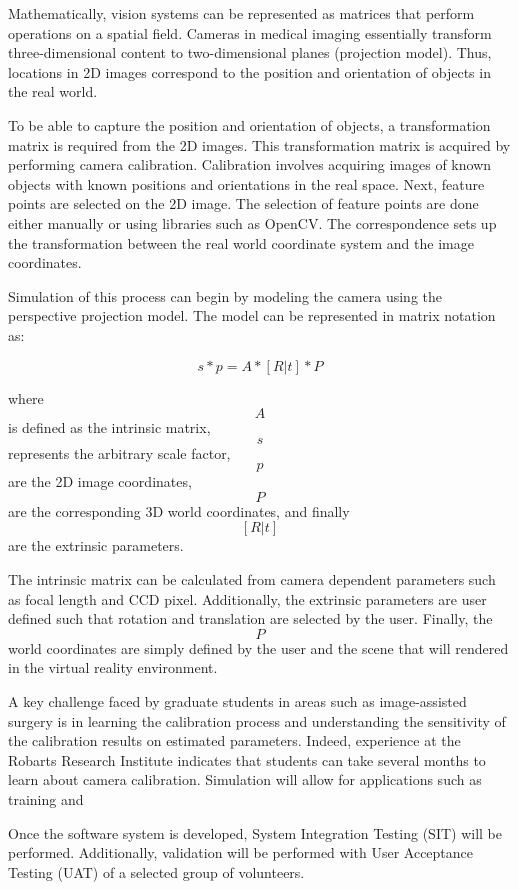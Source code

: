 \documentclass[11pt]{report}
\begin{document}
Mathematically, vision systems can be represented as matrices that perform operations on a spatial field. Cameras in medical imaging essentially transform three-dimensional content to two-dimensional planes (projection model). Thus, locations in 2D images correspond to the position and orientation of objects in the real world.

To be able to capture the position and orientation of objects, a transformation matrix is required from the 2D images. This transformation matrix is acquired by performing camera calibration. Calibration involves acquiring images of known objects with known positions and orientations in the real space. Next, feature points are selected on the 2D image. The selection of feature points are done either manually or using libraries such as OpenCV. The correspondence sets up the transformation between the real world coordinate system and the image coordinates.

Simulation of this process can begin by modeling the camera using the perspective projection model. The model can be represented in matrix notation as:

\begin{equation} s * p = A * [R|t] * P  \end{equation}
 
where  \[A\] is defined as the intrinsic matrix, \[s\] represents the arbitrary scale factor, \[p\] are the 2D image coordinates, \[P\] are the corresponding 3D world coordinates, and finally \[[R|t]\] are the extrinsic parameters.

The intrinsic matrix can be calculated from camera dependent parameters such as focal length and CCD pixel. Additionally, the extrinsic parameters are user defined such that rotation and translation are selected by the user. Finally, the \[P\] world coordinates are simply defined by the user and the scene that will rendered in the virtual reality environment. 

A key challenge faced by graduate students in areas such as image-assisted surgery is in learning the calibration process and understanding the sensitivity of the calibration results on estimated parameters. Indeed, experience at the Robarts Research Institute indicates that students can take several months to learn about camera calibration. Simulation will allow for applications such as training and 

Once the software system is developed, System Integration Testing (SIT) will be performed. Additionally, validation will be performed with User Acceptance Testing (UAT) of a selected group of volunteers. 
\end{document}
